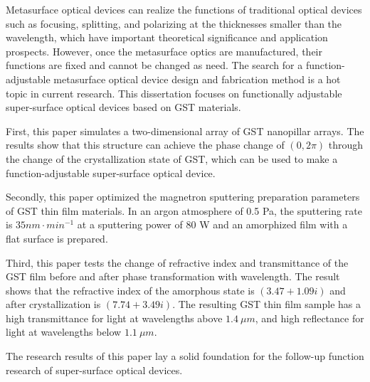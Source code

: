 \begin{eabstract}
 Metasurface optical devices can realize the functions of traditional optical devices such as focusing, splitting, and polarizing at the thicknesses smaller than the wavelength, which have important theoretical significance and application prospects. However, once the metasurface optics are manufactured, their functions are fixed and cannot be changed as need. The search for a function-adjustable metasurface optical device design and fabrication method is a hot topic in current research.
This dissertation focuses on functionally adjustable super-surface optical devices based on GST materials.

First, this paper simulates a two-dimensional array of GST nanopillar arrays. The results show that this structure can achieve the phase change of $\left (0, 2\pi\right)$ through the change of the crystallization state of GST, which can be used to make a function-adjustable super-surface optical device.

Secondly, this paper optimized the magnetron sputtering preparation parameters of GST thin film materials. In an argon atmosphere of 0.5 Pa, the sputtering rate is $35 nm\cdot{}min^{-1}$ at a sputtering power of 80 W and an amorphized film with a flat surface is prepared.

Third, this paper tests the change of refractive index and transmittance of the GST film before and after phase transformation with wavelength. The result shows that the refractive index of the amorphous state is $\left (3.47 + 1.09i \right)$ and after crystallization is $\left (7.74 + 3.49i \right)$. The resulting GST thin film sample has a high transmittance for light at wavelengths above $1.4\ \mu m$, and high reflectance for light at wavelengths below $1.1\ \mu m$.

The research results of this paper lay a solid foundation for the follow-up function research of super-surface optical devices.
\end{eabstract}

